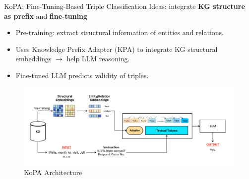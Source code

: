 \documentclass[aspectratio=169,xcolor=dvipsnames]{beamer}
\begin{document}
\begin{frame}{KoPA: Fine-Tuning-Based Triple Classification}
    Ideas: integrate \textbf{KG structure as prefix} and \textbf{fine-tuning}
    \begin{itemize}
        \item Pre-training: extract structural information of entities and relations.
        \item Uses Knowledge Prefix Adapter (KPA) to integrate KG structural embeddings $\rightarrow$ help LLM reasoning.
        \item Fine-tuned LLM predicts validity of triples.
    \end{itemize}
    \begin{figure}[h]
        \centering
        \includegraphics[width=0.9\linewidth]{images/KoPA.pdf}
        \caption{KoPA Architecture}
    \end{figure}
\end{frame}


\end{document}
